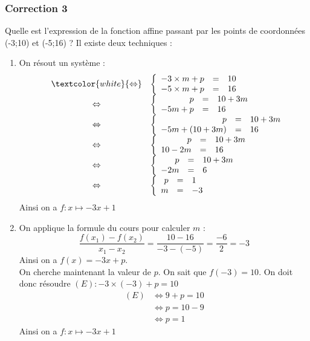 \documentclass[15pt, mathserif]{beamer}
\begin{document}
\begin{frame}
\vspace{-10mm}
	\frametitle{Correction 3}
\vspace*{1cm} 
 \footnotesize{Quelle est l'expression de la fonction affine passant par les points de coordonnées (-3;10) et (-5;16) ? Il existe deux techniques :} 
 \begin{multicols}{2} 
 \begin{enumerate} 
 \item On résout un système : $$ \begin{array}{rcl} 
 & \textcolor{white}{\Leftrightarrow} & 
 \left 
 \{\begin{array}{rcl}-3\times m + p&=&10 \\ 
 -5\times m+p&=&16\end{array} \right. \\ 
 &\Leftrightarrow & \left 
 \{\begin{array}{rcl} p&=&10+3m \\ 
 -5m+p&=&16\end{array} \right. \\ 
 &\Leftrightarrow & \left 
 \{\begin{array}{rcl} p&=&10+3m \\ 
 -5m+(10+3m) &=&16\end{array} \right. \\ &\Leftrightarrow& \left \{\begin{array}{rcl}p&=&10+3m \\ 
 10-2m&=&16\end{array} \right. \\ &\Leftrightarrow& \left \{\begin{array}{rcl}p&=&10+3m \\ 
 -2m&=&6\end{array} \right. \\  &\Leftrightarrow& \left \{\begin{array}{rcl} p&=&1 \\  m&=&-3\end{array}\right. \end{array}$$ 
 Ainsi on a $f:x\mapsto -3x+1$ 
 \columnbreak 
 \item 
 \footnotesize{On applique la formule du cours pour calculer $m$ :$$ \dfrac{f(x_1)-f(x_2)}{x_1-x_2}=\dfrac{10-16}{-3-\left(-5\right)}= \dfrac{-6}{2}=-3$$} \footnotesize{ Ainsi on a $f(x)= -3x +p $. 
  \\ On cherche maintenant la valeur de $p$. On sait que $f(-3)=10$. On doit donc résoudre $(E): -3\times\left(-3\right)+p=10$}	 
 \begin{align*} (E)& \Leftrightarrow 9+p=10\\
		 	 & \Leftrightarrow p=10-9\\
			 & \Leftrightarrow p=1
	 \end{align*} 
 Ainsi on a $f:x\mapsto -3x+1$ 
 \end{enumerate} 
 \end{multicols} 
 \end{frame}
\end{document}
